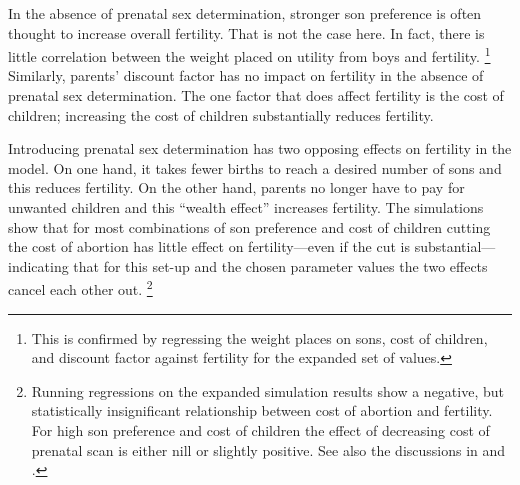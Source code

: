 \documentclass[12pt,letterpaper]{article}
\begin{document}
In the absence of prenatal sex determination, stronger son preference is often thought 
to increase overall fertility.
That is not the case here.
In fact, there is little correlation between the weight placed on utility from boys and 
fertility.%
\footnote{
This is confirmed by regressing the weight places on sons, cost of children,
and discount factor against fertility for the expanded set of values.
}
Similarly, parents' discount factor has no impact on fertility in the absence of
prenatal sex determination.
The one factor that does affect fertility is the cost of children;
increasing the cost of children substantially reduces fertility.


Introducing prenatal sex determination has two opposing effects on fertility 
in the model.
On one hand, it takes fewer births to reach a desired number of sons and this 
reduces fertility.
On the other hand, parents no longer have to pay for unwanted children and 
this ``wealth effect'' increases fertility.
The simulations show that for most combinations of son preference and 
cost of children cutting the cost of abortion has little effect 
on fertility---even if the cut is substantial---indicating that for this 
set-up and the chosen parameter values the two effects 
cancel each other out.%
\footnote{
Running regressions on the expanded simulation results show a negative, but
statistically insignificant relationship between cost of abortion
and fertility.
For high son preference and cost of children the effect of 
decreasing cost of prenatal scan is either nill or slightly
positive.
See also the discussions in \cite{leung94} and \cite{davies97}.
}
\end{document}
